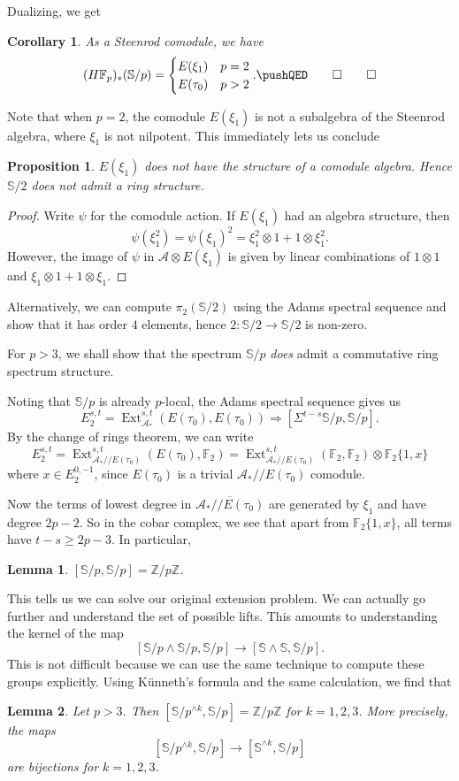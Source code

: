\documentclass{shortart}
\newtheorem*{prop}{Proposition}
\newtheorem*{lemma}{Lemma}
\newtheorem*{cor}{Corollary}
\theoremstyle{definition}
\newcommand\Sph{\mathbb{S}}
\newcommand\F{\mathbb{F}}
\newcommand\Z{\mathbb{Z}}
\newcommand\qq{/\!\!/}
\DeclareMathOperator\Ext{Ext}
\begin{document}
Dualizing, we get
\begin{cor}
  As a Steenrod comodule, we have
  \[
    (H\F_p)_*(\Sph/p) =
    \begin{cases}
      E(\xi_1) & p = 2\\
      E(\tau_0) & p > 2
    \end{cases}.\fakeqed
  \]\ifplastex\fakeqed\fi
\end{cor}
Note that when $p = 2$, the comodule $E(\xi_1)$ is not a subalgebra of the Steenrod algebra, where $\xi_1$ is not nilpotent. This immediately lets us conclude

\begin{prop}
  $E(\xi_1)$ does not have the structure of a comodule algebra. Hence $\Sph/2$ does not admit a ring structure.
\end{prop}

\begin{proof}
  Write $\psi$ for the comodule action. If $E(\xi_1)$ had an algebra structure, then
  \[
    \psi(\xi_1^2) = \psi(\xi_1)^2 = \xi_1^2 \otimes 1 + 1 \otimes \xi_1^2.
  \]
  However, the image of $\psi$ in $\mathcal{A} \otimes E(\xi_1)$ is given by linear combinations of $1 \otimes 1$ and $\xi_1 \otimes 1 + 1 \otimes \xi_1$.
\end{proof}

Alternatively, we can compute $\pi_2(\Sph/2)$ using the Adams spectral sequence and show that it has order $4$ elements, hence $2: \Sph/2 \to \Sph/2$ is non-zero.

For $p > 3$, we shall show that the spectrum $\Sph/p$ \emph{does} admit a commutative ring spectrum structure.

Noting that $\Sph/p$ is already $p$-local, the Adams spectral sequence gives us
\[
  E_2^{s, t} = \Ext^{s, t}_{\mathcal{A}_*} (E(\tau_0), E(\tau_0)) \Rightarrow [\Sigma^{t - s} \Sph/p, \Sph/p].
\]
By the change of rings theorem, we can write
\[
  E_2^{s, t} = \Ext^{s, t}_{\mathcal{A}_*\qq E(\tau_0)} (E(\tau_0), \F_2) = \Ext^{s, t}_{\mathcal{A}_*\qq E(\tau_0)} (\F_2, \F_2) \otimes \F_2\{1, x\}
\]
where $x \in E_2^{0, -1}$, since $E(\tau_0)$ is a trivial $\mathcal{A}_*\qq E(\tau_0)$ comodule.

Now the terms of lowest degree in $\overline{\mathcal{A}_*\qq E(\tau_0)}$ are generated by $\xi_1$ and have degree $2p - 2$. So in the cobar complex, we see that apart from $\F_2\{1, x\}$, all terms have $t - s \geq 2p - 3$. In particular,
\begin{lemma}
  $[\Sph/p, \Sph/p] = \Z/p\Z$.\fakeqed
\end{lemma}
This tells us we can solve our original extension problem. We can actually go further and understand the set of possible lifts. This amounts to understanding the kernel of the map
\[
  [\Sph/p\wedge \Sph/p, \Sph/p] \to [\Sph \wedge \Sph, \Sph/p].
\]
This is not difficult because we can use the same technique to compute these groups explicitly. Using K\"unneth's formula and the same calculation, we find that
\begin{lemma}
  Let $p > 3$. Then $[\Sph/p^{\wedge k}, \Sph/p] = \Z/p\Z$ for $k = 1, 2, 3$. More precisely, the maps
  \[
    [\Sph/p^{\wedge k}, \Sph/p] \to [\Sph^{\wedge k}, \Sph/p]
  \]
  are bijections for $k = 1, 2, 3$.
\end{lemma}
\end{document}
